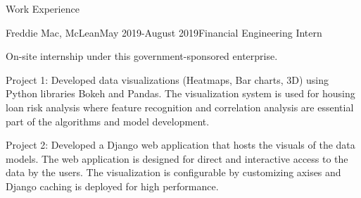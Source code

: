 \documentclass{resume} %
\begin{document}
\begin{rSection}{Work Experience}
\begin{rSubsection}{Freddie Mac, McLean}{May 2019-August 2019}{Financial Engineering Intern}{} 
    \item On-site internship under this government-sponsored enterprise.
    \item Project 1: Developed data visualizations (Heatmaps, Bar charts, 3D) using Python libraries Bokeh and Pandas. The visualization system is used for housing loan risk analysis where feature recognition and correlation analysis are essential part of the algorithms and model development.
    \item Project 2: Developed a Django web application that hosts the visuals of the data models. The web application is designed for direct and interactive access to the data by the users. The visualization is configurable by customizing axises and Django caching is deployed for high performance.
\end{rSubsection}

\end{rSection}

\newpage
\end{document}
